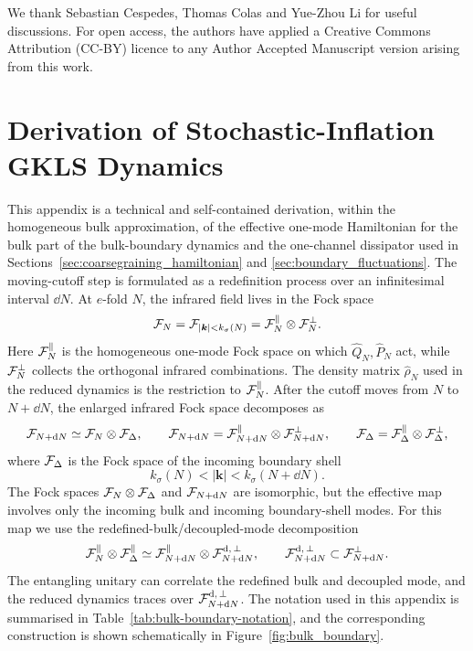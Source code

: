 \documentclass{article}
\def\cF{{\cal F}}
\numberwithin{equation}{section}
\begin{document}
	We thank Sebastian Cespedes, Thomas Colas and Yue-Zhou Li for useful discussions.	For open access, the authors have applied a Creative Commons Attribution (CC-BY) licence to any Author Accepted Manuscript version arising from this work.

	  \newpage \appendix
	\section{Derivation of Stochastic-Inflation GKLS Dynamics}
	\label{app:bulk_boundary_derivation}

	This appendix is a technical and self-contained derivation, within the homogeneous bulk approximation, of the effective one-mode Hamiltonian for the bulk part of the bulk-boundary dynamics and the one-channel dissipator used in Sections~\ref{sec:coarsegraining_hamiltonian} and \ref{sec:boundary_fluctuations}. The moving-cutoff step is formulated as a redefinition process over an infinitesimal interval \(\dd N\). At $e$-fold \(N\), the infrared field lives in the Fock space
	\begin{equation}
		\cF_N = \cF_{|\bm k|<k_\sigma(N)}
		=\cF_N^\parallel\otimes\cF_N^\perp .
	\end{equation}
	Here \(\cF_N^\parallel\) is the homogeneous one-mode Fock space on which \(\hat Q_N,\hat P_N\) act, while \(\cF_N^\perp\) collects the orthogonal infrared combinations. The density matrix \(\hat\rho_N\) used in the reduced dynamics is the restriction to \(\cF_N^\parallel\). After the cutoff moves from \(N\) to \(N+\dd N\), the enlarged infrared Fock space decomposes as
	\begin{equation}
		\cF_{N+\dd N} \simeq \cF_N\otimes\cF_\Delta,\qquad
		\cF_{N+\dd N}=\cF_{N+\dd N}^\parallel\otimes\cF_{N+\dd N}^\perp,\qquad
		\cF_\Delta=\cF_\Delta^\parallel\otimes\cF_\Delta^\perp ,
	\end{equation}
	where \(\cF_\Delta\) is the Fock space of the incoming boundary shell
	\begin{equation}
		k_\sigma(N)<|\bm k|<k_\sigma(N+\dd N).
	\end{equation}
	The Fock spaces \(\cF_N\otimes\cF_\Delta\) and \(\cF_{N+\dd N}\) are isomorphic, but the effective map involves only the incoming bulk and incoming boundary-shell modes. For this map we use the redefined-bulk/decoupled-mode decomposition
	\begin{equation}
		\cF_N^\parallel\otimes\cF_\Delta^\parallel
		\simeq \cF_{N+\dd N}^\parallel\otimes\cF^{\rm d,\,\perp}_{N+\dd N},
		\qquad \cF^{\rm d,\,\perp}_{N+\dd N}\subset\cF_{N+\dd N}^\perp .
		\label{eq:ParallelOutputDecompositionApp}
	\end{equation}
	The entangling unitary can correlate the redefined bulk and decoupled mode, and the reduced dynamics traces over \(\cF^{\rm d,\,\perp}_{N+\dd N}\). The notation used in this appendix is summarised in Table~\ref{tab:bulk-boundary-notation}, and the corresponding construction is shown schematically in Figure~\ref{fig:bulk_boundary}.
\end{document}
